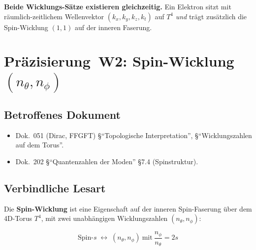 \textbf{Beide Wicklungs-Sätze existieren gleichzeitig.} Ein
Elektron sitzt mit räumlich-zeitlichem Wellenvektor
$(k_x,k_y,k_z,k_t)$ auf $T^4$ \emph{und} trägt zusätzlich die
Spin-Wicklung $(1,1)$ auf der inneren Faserung.

\section{\texorpdfstring{Präzisierung~W2: Spin-Wicklung $(n_\theta, n_\phi)$}{Praezisierung W2: Spin-Wicklung}}

\subsection*{Betroffenes Dokument}

\begin{itemize}
  \item Dok.~051 (Dirac, FFGFT) §\enquote{Topologische
        Interpretation}, §\enquote{Wicklungszahlen auf dem Torus}.
  \item Dok.~202 §\enquote{Quantenzahlen der Moden} \S 7.4
        (Spinstruktur).
\end{itemize}

\subsection*{Verbindliche Lesart}

Die \textbf{Spin-Wicklung} ist eine Eigenschaft auf der inneren
Spin-Faserung über dem 4D-Torus $T^4$, mit zwei unabhängigen
Wicklungszahlen $(n_\theta, n_\phi)$:

\begin{equation}
  \text{Spin-}s \;\longleftrightarrow\;
  (n_\theta, n_\phi)\ \text{mit}\ \frac{n_\phi}{n_\theta} = 2s
  \tag{210.2}
\end{equation}

\begin{center}
{\footnotesize
{}
}
\end{center}

